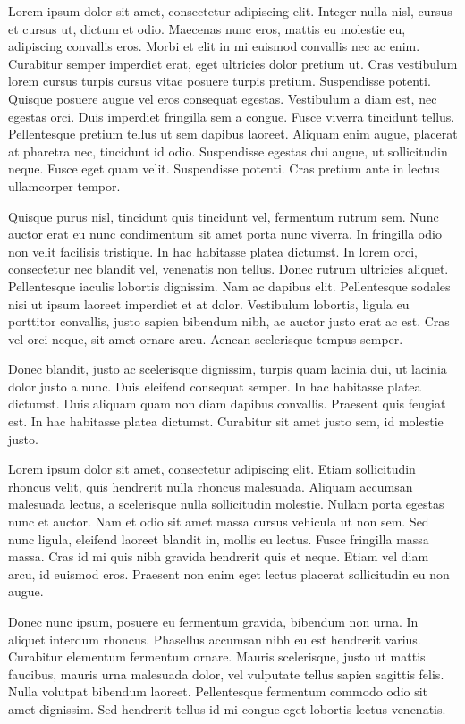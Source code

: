 \documentclass[12pt,lot,lof]{quthesis}
\begin{document}
Lorem ipsum dolor sit amet, consectetur adipiscing elit. Integer nulla nisl, cursus et cursus ut, dictum et odio. Maecenas nunc eros, mattis eu molestie eu, adipiscing convallis eros. Morbi et elit in mi euismod convallis nec ac enim. Curabitur semper imperdiet erat, eget ultricies dolor pretium ut. Cras vestibulum lorem cursus turpis cursus vitae posuere turpis pretium. Suspendisse potenti. Quisque posuere augue vel eros consequat egestas. Vestibulum a diam est, nec egestas orci. Duis imperdiet fringilla sem a congue. Fusce viverra tincidunt tellus. Pellentesque pretium tellus ut sem dapibus laoreet. Aliquam enim augue, placerat at pharetra nec, tincidunt id odio. Suspendisse egestas dui augue, ut sollicitudin neque. Fusce eget quam velit. Suspendisse potenti. Cras pretium ante in lectus ullamcorper tempor.

Quisque purus nisl, tincidunt quis tincidunt vel, fermentum rutrum sem. Nunc auctor erat eu nunc condimentum sit amet porta nunc viverra. In fringilla odio non velit facilisis tristique. In hac habitasse platea dictumst. In lorem orci, consectetur nec blandit vel, venenatis non tellus. Donec rutrum ultricies aliquet. Pellentesque iaculis lobortis dignissim. Nam ac dapibus elit. Pellentesque sodales nisi ut ipsum laoreet imperdiet et at dolor. Vestibulum lobortis, ligula eu porttitor convallis, justo sapien bibendum nibh, ac auctor justo erat ac est. Cras vel orci neque, sit amet ornare arcu. Aenean scelerisque tempus semper.

Donec blandit, justo ac scelerisque dignissim, turpis quam lacinia dui, ut lacinia dolor justo a nunc. Duis eleifend consequat semper. In hac habitasse platea dictumst. Duis aliquam quam non diam dapibus convallis. Praesent quis feugiat est. In hac habitasse platea dictumst. Curabitur sit amet justo sem, id molestie justo.

Lorem ipsum dolor sit amet, consectetur adipiscing elit. Etiam sollicitudin rhoncus velit, quis hendrerit nulla rhoncus malesuada. Aliquam accumsan malesuada lectus, a scelerisque nulla sollicitudin molestie. Nullam porta egestas nunc et auctor. Nam et odio sit amet massa cursus vehicula ut non sem. Sed nunc ligula, eleifend laoreet blandit in, mollis eu lectus. Fusce fringilla massa massa. Cras id mi quis nibh gravida hendrerit quis et neque. Etiam vel diam arcu, id euismod eros. Praesent non enim eget lectus placerat sollicitudin eu non augue.

Donec nunc ipsum, posuere eu fermentum gravida, bibendum non urna. In aliquet interdum rhoncus. Phasellus accumsan nibh eu est hendrerit varius. Curabitur elementum fermentum ornare. Mauris scelerisque, justo ut mattis faucibus, mauris urna malesuada dolor, vel vulputate tellus sapien sagittis felis. Nulla volutpat bibendum laoreet. Pellentesque fermentum commodo odio sit amet dignissim. Sed hendrerit tellus id mi congue eget lobortis lectus venenatis.
\end{document}
